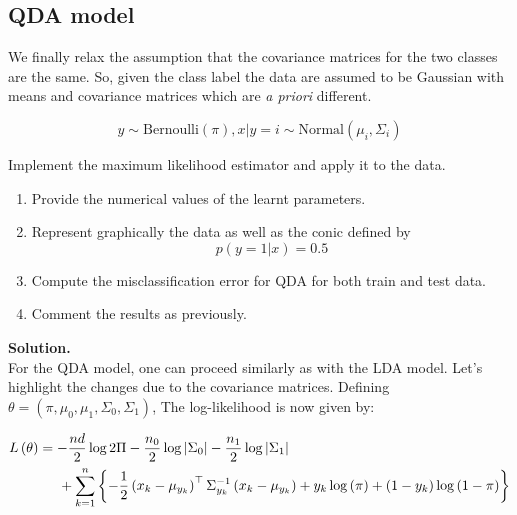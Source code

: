 \documentclass[a4paper, 11pt]{article}
\begin{document}
\subsection{QDA model}

We finally relax the assumption that the covariance matrices for the two classes are the same. So, given the class label the data are assumed to be Gaussian with means and covariance matrices which are \textit{a priori} different.

\begin{equation*}
    y \sim \text{Bernoulli} \left( \pi \right), x|y = i \sim \text{Normal} \left( \mu_{i}, \Sigma_{i} \right)
\end{equation*}

Implement the maximum likelihood estimator and apply it to the data.

\begin{enumerate}[label=\alph*]
    \item Provide the numerical values of the learnt parameters.
    
    \item Represent graphically the data as well as the conic defined by
    \begin{equation*}
        p \left( y = 1 | x \right) = 0.5
    \end{equation*}
    
    \item Compute the misclassification error for QDA for both train and test data.
    
    \item Comment the results as previously.
\end{enumerate}

\textbf{Solution.} \\

For the QDA model, one can proceed similarly as with the LDA model. Let's highlight the changes due to the covariance matrices. Defining $\theta = \left( \pi, \mu_{0}, \mu_{1}, \Sigma_{0}, \Sigma_{1} \right)$, The log-likelihood is now given by:

\begin{equation*}
    \begin{aligned}
    L \left( \theta \right) &= - \frac{nd}{2} \log 2 \Pi - \frac{n_{0}}{2} \log \left| \Sigma_{0} \right| - \frac{n_{1}}{2} \log \left| \Sigma_{1} \right| \\
    &\hspace*{.5cm} + \sum_{k=1}^{n} \left\{ - \frac{1}{2} \left( x_k - \mu_{y_k} \right)^\top \Sigma^{-1}_{y_{k}} \left( x_k - \mu_{y_k} \right) + y_{k} \log \left( \pi \right) + \left( 1 - y_{k} \right) \log \left( 1 - \pi \right) \right\}
    \end{aligned}
\end{equation*}
\end{document}
